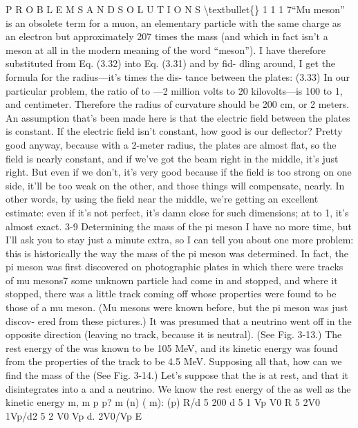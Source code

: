 \documentclass[10pt,oneside]{article}
\begin{document}
P R O B L E M S  A N D  S O L U T I O N S \textbackslash{}textbullet\{\} 1 1 1 7“Mu meson” is an obsolete term for a muon, an elementary particle with the same charge as an electron but approximately 207 times the mass (and which in fact isn’t a meson at all in the modern meaning of the word “meson”). I have therefore substituted from Eq. (3.32) into Eq. (3.31) and by fid- dling around, I get the formula for the radius---it’s times the dis- tance between the plates: (3.33) In our particular problem, the ratio of to ---2 million volts to 20 kilovolts---is 100 to 1, and centimeter. Therefore the radius of curvature should be 200 cm, or 2 meters. An assumption that’s been made here is that the electric field between the plates is constant. If the electric field isn’t constant, how good is our deflector? Pretty good anyway, because with a 2-meter radius, the plates are almost flat, so the field is nearly constant, and if we’ve got the beam right in the middle, it’s just right. But even if we don’t, it’s very good because if the field is too strong on one side, it’ll be too weak on the other, and those things will compensate, nearly. In other words, by using the field near the middle, we’re getting an excellent estimate: even if it’s not perfect, it’s damn close for such dimensions; at to 1, it’s almost exact. 3-9 Determining the mass of the pi meson I have no more time, but I’ll ask you to stay just a minute extra, so I can tell you about one more problem: this is historically the way the mass of the pi meson was determined. In fact, the pi meson was first discovered on photographic plates in which there were tracks of mu mesons7 some unknown particle had come in and stopped, and where it stopped, there was a little track coming off whose properties were found to be those of a mu meson. (Mu mesons were known before, but the pi meson was just discov- ered from these pictures.) It was presumed that a neutrino went off in the opposite direction (leaving no track, because it is neutral). (See Fig. 3-13.) The rest energy of the was known to be 105 MeV, and its kinetic energy was found from the properties of the track to be 4.5 MeV. Supposing all that, how can we find the mass of the (See Fig. 3-14.) Let’s suppose that the is at rest, and that it disintegrates into a and a neutrino. We know the rest energy of the as well as the kinetic energy m, m p p? m (n) ( m): (p) R/d 5 200 d 5 1 Vp V0 R 5 2V0 1Vp/d2 5 2 V0 Vp d. 2V0/Vp E\par
\end{document}
